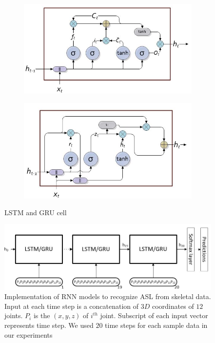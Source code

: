 \documentclass[10pt,twocolumn,letterpaper]{article}
\begin{document}
\begin{figure}[h]
	\begin{center}
		\begin{subfigure}{.45\textwidth}
			\includegraphics[width=\linewidth, height=.2\textheight]{lstm_cell}
			\caption{}
			\label{fig:lstm_cell} 
		\end{subfigure}
		
		\begin{subfigure}{.45\textwidth}
			\includegraphics[width=\linewidth, height=.2\textheight]{gru_cell}
			\caption{}
			\label{fig:gru_cell} 
		\end{subfigure}
	\end{center}
	\caption{LSTM and GRU cell}
	\label{fig:lstm_gru_cells}
\end{figure}
\begin{figure}[h]
	\begin{center}
		\includegraphics[width=.8\linewidth]{rnn_impl}
	\end{center}
	\caption{Implementation of RNN models to recognize ASL from skeletal data. Input at each time step is a concatenation of $3D$ coordinates of $12$ joints. $P_i$ is the $(x, y, z)$ of $i^{th}$ joint. Subscript of each input vector represents time step. We used $20$ time steps for each sample data in our experiments}
	\label{fig:rnn_impl}
\end{figure}
\end{document}
